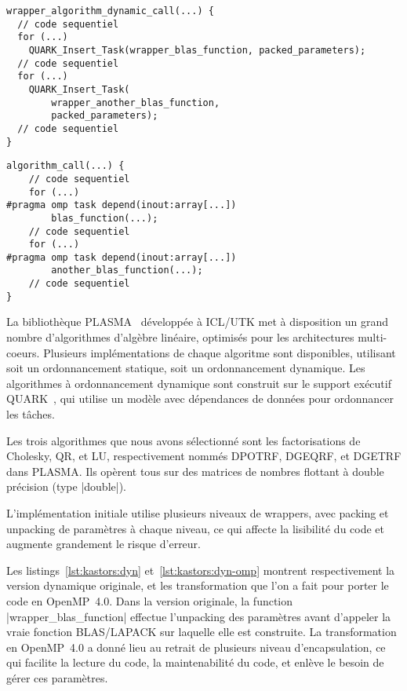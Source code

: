 \begin{lstlisting}[caption=Format de l'algorithme dynamique,label=lst:kastors:dyn]
wrapper_algorithm_dynamic_call(...) {
  // code sequentiel
  for (...)
    QUARK_Insert_Task(wrapper_blas_function, packed_parameters);
  // code sequentiel
  for (...)
    QUARK_Insert_Task(
        wrapper_another_blas_function,
        packed_parameters);
  // code sequentiel
}
\end{lstlisting}
\begin{lstlisting}[caption=Format de l'algorithme OpenMP,label=lst:kastors:dyn-omp]
algorithm_call(...) {
    // code sequentiel
    for (...)
#pragma omp task depend(inout:array[...])
        blas_function(...);
    // code sequentiel
    for (...)
#pragma omp task depend(inout:array[...])
        another_blas_function(...);
    // code sequentiel
}
\end{lstlisting}

La bibliothèque PLASMA~\cite{Kurzak2013} développée à ICL/UTK met à disposition un grand nombre d'algorithmes d'algèbre linéaire, optimisés pour les architectures multi-coeurs.
Plusieurs implémentations de chaque algoritme sont disponibles, utilisant soit un ordonnancement statique, soit un ordonnancement dynamique.
Les algorithmes à ordonnancement dynamique sont construit sur le support exécutif QUARK~\cite{YarKhan2011}, qui utilise un modèle avec dépendances de données pour ordonnancer les tâches.

Les trois algorithmes que nous avons sélectionné sont les factorisations de Cholesky, QR, et LU, respectivement nommés DPOTRF, DGEQRF, et DGETRF dans PLASMA.
Ils opèrent tous sur des matrices de nombres flottant à double précision (type |double|).

L'implémentation initiale utilise plusieurs niveaux de wrappers, avec packing et unpacking de paramètres à chaque niveau, ce qui affecte la lisibilité du code et augmente grandement le risque d'erreur.

Les listings~\ref{lst:kastors:dyn} et~\ref{lst:kastors:dyn-omp} montrent respectivement la version dynamique originale, et les transformation que l'on a fait pour porter le code en OpenMP~4.0.
Dans la version originale, la function |wrapper_blas_function| effectue l'unpacking des paramètres avant d'appeler la vraie fonction BLAS/LAPACK sur laquelle elle est construite.
La transformation en OpenMP~4.0 a donné lieu au retrait de plusieurs niveau d'encapsulation, ce qui facilite la lecture du code, la maintenabilité du code, et enlève le besoin de gérer ces paramètres.

